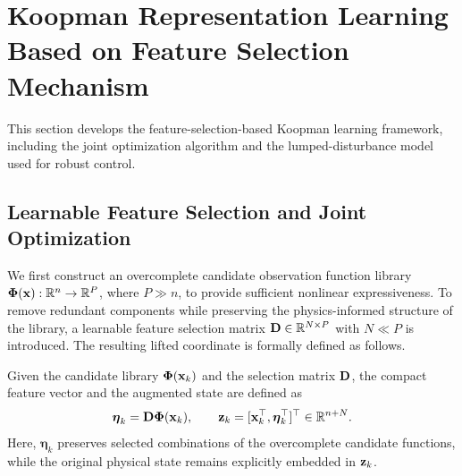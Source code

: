 \section{Koopman Representation Learning Based on Feature Selection Mechanism}
\label{sec:koopman}

This section develops the feature-selection-based Koopman learning framework, including the joint optimization algorithm and the lumped-disturbance model used for robust control.

\subsection{Learnable Feature Selection and Joint Optimization}
\label{subsec:algorithm}
We first construct an overcomplete candidate observation function library $\boldsymbol{\Phi}(\mathbf{x}):\mathbb{R}^n\to\mathbb{R}^P$, where $P\gg n$, to provide sufficient nonlinear expressiveness. To remove redundant components while preserving the physics-informed structure of the library, a learnable feature selection matrix $\mathbf{D}\in\mathbb{R}^{N\times P}$ with $N\ll P$ is introduced. The resulting lifted coordinate is formally defined as follows.

{
\begin{definition}
Given the candidate library $\boldsymbol{\Phi}(\mathbf{x}_k)$ and the selection matrix $\mathbf{D}$, the compact feature vector and the augmented state are defined as
\begin{equation}
\boldsymbol{\eta}_k = \mathbf{D}\boldsymbol{\Phi}(\mathbf{x}_k), \qquad
\mathbf{z}_k = [\mathbf{x}_k^\top, \boldsymbol{\eta}_k^\top]^\top \in \mathbb{R}^{n+N}.
\end{equation}
Here, $\boldsymbol{\eta}_k$ preserves selected combinations of the overcomplete candidate functions, while the original physical state remains explicitly embedded in $\mathbf{z}_k$.
\end{definition}
}

